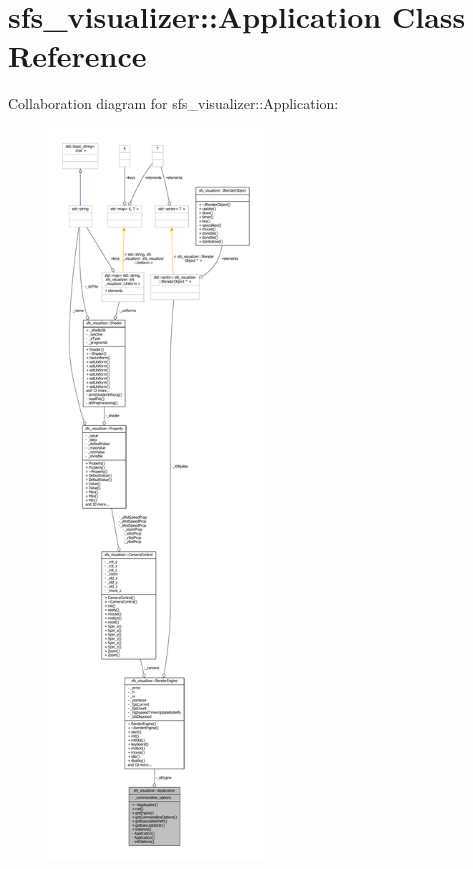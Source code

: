 \section{sfs\-\_\-visualizer\-:\-:Application Class Reference}
\label{classsfs__visualizer_1_1Application}


Collaboration diagram for sfs\-\_\-visualizer\-:\-:Application\-:\nopagebreak
\begin{figure}[H]
\begin{center}
\leavevmode
\includegraphics[height=550pt]{df/d88/classsfs__visualizer_1_1Application__coll__graph}
\end{center}
\end{figure}
